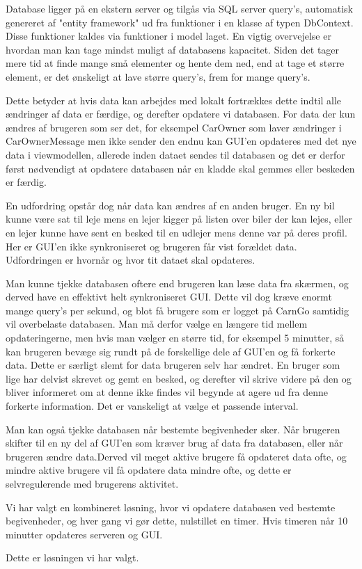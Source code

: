 \documentclass[SoftwareDesign/SoftwareDesign_main.tex]{subfiles}
\begin{document}
Database ligger på en ekstern server og tilgås via SQL server query's, automatisk genereret af "entity framework" ud fra funktioner i en klasse af typen DbContext. Disse funktioner kaldes via funktioner i model laget. En vigtig overvejelse er hvordan man kan tage mindst muligt af databasens kapacitet. Siden det tager mere tid at finde mange små elementer og hente dem ned, end at tage et større element, er det ønskeligt at lave større query's, frem for mange query's.

Dette betyder at hvis data kan arbejdes med lokalt fortrækkes dette indtil alle ændringer af data er færdige, og derefter opdatere vi databasen.
For data der kun ændres af brugeren som ser det, for eksempel CarOwner som laver ændringer i CarOwnerMessage men ikke sender den endnu kan GUI'en opdateres med det nye data i viewmodellen, allerede inden dataet sendes til databasen og det er derfor først nødvendigt at opdatere databasen når en kladde skal gemmes eller beskeden er færdig.

En udfordring opstår dog når data kan ændres af en anden bruger. En ny bil kunne være sat til leje mens en lejer kigger på listen over biler der kan lejes, eller en lejer kunne have sent en besked til en udlejer mens denne var på deres profil. Her er GUI'en ikke synkroniseret og brugeren får vist forældet data.
Udfordringen er hvornår og hvor tit dataet skal opdateres.

Man kunne tjekke databasen oftere end brugeren kan læse data fra skærmen, og derved have en effektivt helt synkroniseret GUI. Dette vil dog kræve enormt mange query's per sekund, og blot få brugere som er logget på CarnGo samtidig vil overbelaste databasen. Man må derfor vælge en længere tid mellem opdateringerne, men hvis man vælger en større tid, for eksempel 5 minutter, så kan brugeren bevæge sig rundt på de forskellige dele af GUI'en og få forkerte data. Dette er særligt slemt for data brugeren selv har ændret. En bruger som lige har delvist skrevet og gemt en besked, og derefter vil skrive videre på den og bliver informeret om at denne ikke findes vil begynde at agere ud fra denne forkerte information. Det er vanskeligt at vælge et passende interval.

Man kan også tjekke databasen når bestemte begivenheder sker. Når brugeren skifter til en ny del af GUI'en som kræver brug af data fra databasen, eller når brugeren ændre data.Derved vil meget aktive brugere få opdateret data ofte, og mindre aktive brugere vil få opdatere data mindre ofte, og dette er selvregulerende med brugerens aktivitet. 

Vi har valgt en kombineret løsning, hvor vi opdatere databasen ved bestemte begivenheder, og hver gang vi gør dette, nulstillet en timer. Hvis timeren når 10 minutter opdateres serveren og GUI.

Dette er løsningen vi har valgt.
\end{document}
